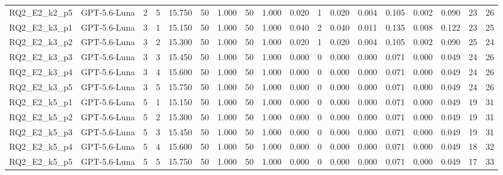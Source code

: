 \begin{table}[htbp]
\begin{tabular}{llrrrrrrrrrrrrrrrr}
RQ2\_E2\_k2\_p5 & GPT-5.6-Luna & 2 & 5 & 15.750 & 50 & 1.000 & 50 & 1.000 & 0.020 & 1 & 0.020 & 0.004 & 0.105 & 0.002 & 0.090 & 23 & 26 \\
RQ2\_E2\_k3\_p1 & GPT-5.6-Luna & 3 & 1 & 15.150 & 50 & 1.000 & 50 & 1.000 & 0.040 & 2 & 0.040 & 0.011 & 0.135 & 0.008 & 0.122 & 23 & 25 \\
RQ2\_E2\_k3\_p2 & GPT-5.6-Luna & 3 & 2 & 15.300 & 50 & 1.000 & 50 & 1.000 & 0.020 & 1 & 0.020 & 0.004 & 0.105 & 0.002 & 0.090 & 25 & 24 \\
RQ2\_E2\_k3\_p3 & GPT-5.6-Luna & 3 & 3 & 15.450 & 50 & 1.000 & 50 & 1.000 & 0.000 & 0 & 0.000 & 0.000 & 0.071 & 0.000 & 0.049 & 24 & 26 \\
RQ2\_E2\_k3\_p4 & GPT-5.6-Luna & 3 & 4 & 15.600 & 50 & 1.000 & 50 & 1.000 & 0.000 & 0 & 0.000 & 0.000 & 0.071 & 0.000 & 0.049 & 24 & 26 \\
RQ2\_E2\_k3\_p5 & GPT-5.6-Luna & 3 & 5 & 15.750 & 50 & 1.000 & 50 & 1.000 & 0.000 & 0 & 0.000 & 0.000 & 0.071 & 0.000 & 0.049 & 24 & 26 \\
RQ2\_E2\_k5\_p1 & GPT-5.6-Luna & 5 & 1 & 15.150 & 50 & 1.000 & 50 & 1.000 & 0.000 & 0 & 0.000 & 0.000 & 0.071 & 0.000 & 0.049 & 19 & 31 \\
RQ2\_E2\_k5\_p2 & GPT-5.6-Luna & 5 & 2 & 15.300 & 50 & 1.000 & 50 & 1.000 & 0.000 & 0 & 0.000 & 0.000 & 0.071 & 0.000 & 0.049 & 19 & 31 \\
RQ2\_E2\_k5\_p3 & GPT-5.6-Luna & 5 & 3 & 15.450 & 50 & 1.000 & 50 & 1.000 & 0.000 & 0 & 0.000 & 0.000 & 0.071 & 0.000 & 0.049 & 19 & 31 \\
RQ2\_E2\_k5\_p4 & GPT-5.6-Luna & 5 & 4 & 15.600 & 50 & 1.000 & 50 & 1.000 & 0.000 & 0 & 0.000 & 0.000 & 0.071 & 0.000 & 0.049 & 18 & 32 \\
RQ2\_E2\_k5\_p5 & GPT-5.6-Luna & 5 & 5 & 15.750 & 50 & 1.000 & 50 & 1.000 & 0.000 & 0 & 0.000 & 0.000 & 0.071 & 0.000 & 0.049 & 17 & 33 \\
\bottomrule
\end{tabular}
\end{table}